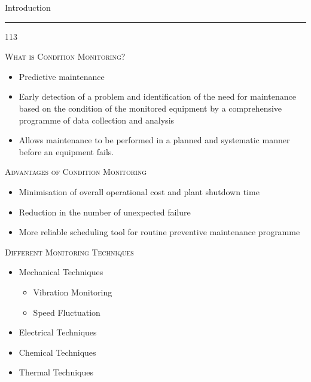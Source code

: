 \documentclass[a4,portrait,slidesonly]{seminar}
\begin{document}
\begin{slide*}
{\large \textsf{Introduction}}\\
\hrule
\vspace{10pt}
\begin{dinglist} {113}
\item \textsc{What is Condition Monitoring?}
    \begin{itemize} 
    \item Predictive maintenance
    \item Early detection of a problem and identification of the need for maintenance based on the condition of the monitored equipment by a comprehensive programme of data collection and analysis
    \item Allows maintenance to be performed in a planned and systematic manner before an equipment fails.
    \end{itemize}
\item \textsc{Advantages of Condition Monitoring}
    \begin{itemize}
    \item Minimisation of overall operational cost and plant shutdown time
    \item Reduction in the number of unexpected failure
    \item More reliable scheduling tool for routine preventive maintenance programme
    \end{itemize}
\item \textsc{Different Monitoring Techniques}
    \begin{itemize}
    \item Mechanical Techniques
            \begin{itemize}
            \item Vibration Monitoring
            \item Speed Fluctuation
            \end{itemize}
    \item Electrical Techniques
    \item Chemical Techniques
    \item Thermal Techniques
    \end{itemize}
\end{dinglist}
\end{slide*}
\end{document}
